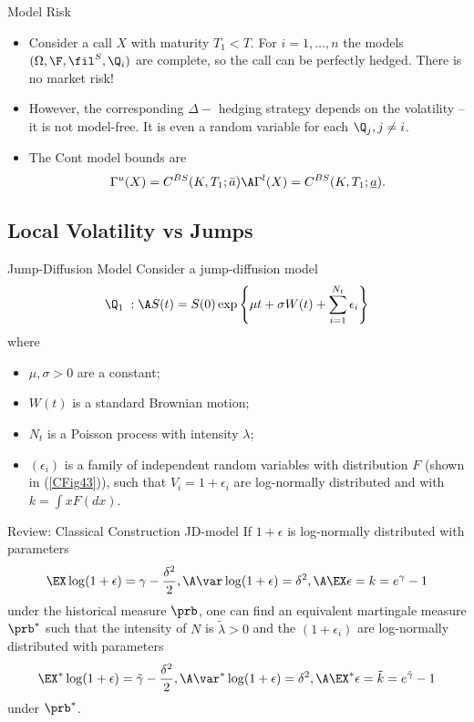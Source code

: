 {Model Risk}
\begin{itemize}
\item<1-> Consider a call $X$ with maturity $T_1 <T$. For $i=1, \ldots, n$ the models
$(\Omega, \F, \fil^S, \Q_i)$ are complete, so the call can be perfectly hedged. There is no market risk!
\item<2->
However, the corresponding $\Delta-$ hedging strategy depends on the volatility -- it is not model-free. It is even a random variable for each $\Q_j, j \not = i$.
\item<3->
The Cont model bounds are
$$
\Gamma^u(X)=C^{BS}(K, T_1; \bar{a})  \A \Gamma^l(X)=C^{BS}(K, T_1; \underline{a}).$$

\end{itemize}



\subsection{Local Volatility vs Jumps}

{Jump-Diffusion Model}
Consider a jump-diffusion model
\begin{equation}\label{jump-diffusion-model}
\Q_1\; : \A S(t)=S(0) \exp\left\{\mu t + \sigma  W(t) + \sum_{i=1}^{N_t} \epsilon_i\right\}
\end{equation}
where
\begin{itemize}
\item $\mu, \sigma>0$ are a constant;
\item $W(t)$ is a standard Brownian motion;
\item $N_t$ is a Poisson process with intensity $\lambda$;
\item $(\epsilon_i)$ is a family of independent random variables with distribution $F$
(shown in (\ref{CFig43})), such that
$V_i= 1+\epsilon_i$ are log-normally distributed and
with $k = \int x F(dx)$.
\end{itemize}



{Review: Classical Construction JD-model}
If $1+\epsilon$ is log-normally distributed  with parameters
$$
\EX\log(1+\epsilon)= \gamma-\frac{\delta^2}{2},\A
\var\log(1+\epsilon)=\delta^2, \A \EX\epsilon=k=e^\gamma-1
$$
under the historical measure $\prb$, one can find an equivalent
martingale measure $\prb^*$ such that the intensity of $N$ is
$\tilde{\lambda}>0$ and the $(1+\epsilon_i)$ are log-normally
distributed with parameters
$$
\EX^*\log(1+\epsilon)= \tilde{\gamma}-\frac{\delta^2}{2},\A
\var^*\log(1+\epsilon)=\delta^2, \A
\EX^*\epsilon=\tilde{k}=e^{\tilde{\gamma}}-1
$$
under $\prb^*$.



